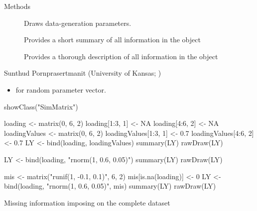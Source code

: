 \documentclass[a4paper]{book}
\begin{document}
%
\begin{Section}{Methods}
\begin{description}

\item[] Draws data-generation parameters.
\item[] Provides a short summary of all information in the object 
\item[] Provides a thorough description of all information in the object 

\end{description}

\end{Section}
%
\begin{Author}\relax
Sunthud Pornprasertmanit (University of Kansas; )
\end{Author}
%
\begin{SeeAlso}\relax
\begin{itemize}

\item {} for random parameter vector.

\end{itemize}

\end{SeeAlso}
%
\begin{Examples}
\begin{ExampleCode}
showClass("SimMatrix")

loading <- matrix(0, 6, 2)
loading[1:3, 1] <- NA
loading[4:6, 2] <- NA
loadingValues <- matrix(0, 6, 2)
loadingValues[1:3, 1] <- 0.7
loadingValues[4:6, 2] <- 0.7
LY <- bind(loading, loadingValues)
summary(LY)
rawDraw(LY)

LY <- bind(loading, "rnorm(1, 0.6, 0.05)")
summary(LY)
rawDraw(LY)

mis <- matrix("runif(1, -0.1, 0.1)", 6, 2)
mis[is.na(loading)] <- 0
LY <- bind(loading, "rnorm(1, 0.6, 0.05)", mis)
summary(LY)
rawDraw(LY)
\end{ExampleCode}
\end{Examples}
%
\begin{Description}\relax
Missing information imposing on the complete dataset
\end{Description}
\end{document}
